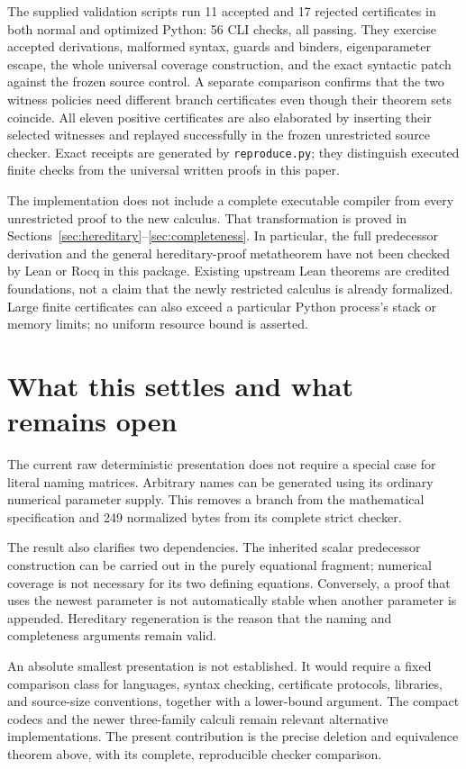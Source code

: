 \documentclass[11pt]{article}
\theoremstyle{definition}\newtheorem{definition}[theorem]{Definition}
\theoremstyle{remark}\newtheorem{remark}[theorem]{Remark}
\newcommand{\code}[1]{\texttt{#1}}
\begin{document}
The supplied validation scripts run 11 accepted and 17 rejected certificates
in both normal and optimized Python: 56 CLI checks, all passing. They
exercise accepted derivations, malformed
syntax, guards and binders, eigenparameter escape, the whole universal
coverage construction, and the exact syntactic patch against the frozen source control. A
separate comparison confirms that the two witness policies need different
branch certificates even though their theorem sets coincide. All eleven
positive certificates are also elaborated by inserting their selected
witnesses and replayed successfully in the frozen unrestricted source
checker. Exact receipts are
generated by \code{reproduce.py}; they distinguish executed finite
checks from the universal written proofs in this paper.

The implementation does not include a complete executable compiler
from every unrestricted proof to the new calculus. That transformation
is proved in Sections~\ref{sec:hereditary}--\ref{sec:completeness}.
In particular, the full predecessor derivation and the general
hereditary-proof metatheorem have not been checked by Lean or Rocq in
this package. Existing upstream Lean theorems are credited foundations,
not a claim that the newly restricted calculus is already formalized.
Large finite certificates can also exceed a particular Python process's
stack or memory limits; no uniform resource bound is asserted.

\section{What this settles and what remains open}

The current raw deterministic presentation does not require a special
case for literal naming matrices. Arbitrary names can be generated
using its ordinary numerical parameter supply. This removes a branch
from the mathematical specification and 249 normalized bytes from its
complete strict checker.

The result also clarifies two dependencies. The inherited scalar
predecessor construction can be carried out in the purely equational
fragment; numerical coverage is not necessary for its two defining
equations. Conversely, a proof that uses the newest parameter is not
automatically stable when another parameter is appended. Hereditary
regeneration is the reason that the naming and completeness arguments
remain valid.

An absolute smallest presentation is not established. It would require
a fixed comparison class for languages, syntax checking, certificate
protocols, libraries, and source-size conventions, together with a
lower-bound argument. The compact codecs and the newer three-family
calculi remain relevant alternative implementations. The present
contribution is the precise deletion and equivalence theorem above,
with its complete, reproducible checker comparison.
\end{document}
